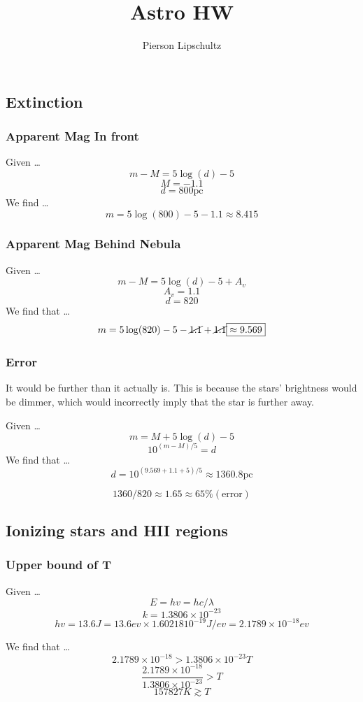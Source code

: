 \documentclass{article}
\title{Astro HW \hwNUM}
\author{Pierson Lipschultz}
\def\hwNUM{9}
\begin{document}
\maketitle
\setcounter{section}{\hwNUM}

\subsection{Extinction}

\subsubsection{Apparent Mag In front}
Given \dots
\[m-M=5\log(d)-5\]
\[M = -1.1 \]
\[d = 800\text{pc}\]
We find \dots
\[m = 5\log(800)-5 -1.1 \boxed{\approx 8.415}\]
\subsubsection{Apparent Mag Behind Nebula}
Given \dots
\[m-M=5\log(d)-5 + A_v\]
\[A_v = 1.1\]
\[d = 820\]
We find that \dots
\[m = 5\log(820)-5 -\cancel{1.1}+ \cancel{1.1}\boxed{ \approx 9.569}\]

\subsubsection{Error}
It would be further than it actually is. This is because the stars' brightness would be dimmer, which would incorrectly imply that the star is further away. 

Given \dots
\[m = M + 5\log(d)- 5 \]
\[10^{(m-M)/5} = d\]
We find that \dots
\[d = 10^{(9.569 +1.1 +5 )/5} \approx 1360.8\text{pc}\]

\[1360/820 \approx 1.65 \approx \boxed{65\% (\text{error})} \]


\subsection{Ionizing stars and HII regions}
\subsubsection{Upper bound of T }
\def\phv{13.6}
\def\k{1.3806 \times 10^{-23}}
Given \dots
\[E = hv = hc/\lambda\]
\[k = \k\]
\[hv = \phv J = 13.6ev \times 1.6021810^{-19}J/ev = 2.1789 \times 10^{-18} ev \]

We find that \dots
\[2.1789 \times 10^{-18} > \k T\]
\[\frac{2.1789 \times 10^{-18}}{\k} > T \]
\[\boxed{157827K \gtrsim T} \]
\end{document}
